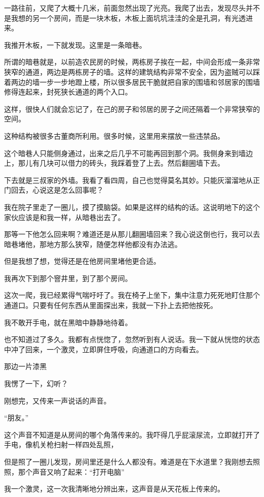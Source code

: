 一路往前，又爬了大概十几米，前面忽然出现了光亮。我爬了出去，发现尽头并不是我想的另一个房间，而是一块木板，木板上面坑坑洼洼的全是孔洞，有光透进来。

我推开木板，一下就发现。这里是一条暗巷。

所谓的暗巷就是，以前造农民房的时候，两栋房子挨在一起，中间会形成一条非常狭窄的通道，两边是两栋房子的墙。这样的建筑结构非常不安全，因为盗贼可以踩着两边的墙一步一步地蹬上楼，所以很多居民干脆就把自家的围墙和邻居家的围墙修得连起来，封死狭长通道的两个入口。

这样，很快人们就会忘记了，在己的房子和邻居的房子之间还隔着一个非常狭窄的空间。

这种结构被很多古董商所利用。很多时候，这里用来摆放一些违禁品。

这个暗巷人只能侧身通过，出来之后几乎不可能再回到那个洞。我侧身来到墙边上，那儿有几块可以借力的砖头，我踩着登了上去。然后翻圌墙下去。

下去就是三叔家的外墙。我看了看四周，自己也觉得莫名其妙。只能灰溜溜地从正门回去，心说这是怎么回事呢？

我在院子里走了一圈儿，摸了摸脑袋。如果是这样的结构的话。这说明地下的这个家伙应该是和我一样，从暗巷出去了。

那等一下他怎么回来啊？难道还是从那儿翻圌墙回来？我心说这倒也行，我可以去暗巷堵他，那地方那么狭窄，随便怎样他都没有办法逃。

但是我想了想，觉得还是在他房间里堵他更合适。

我再次下到那个窨井里，到了那个房间。

这次一爬，我已经累得气喘吁吁了。我在椅子上坐下，集中注意力死死地盯住那个通道口。只要有任何东西从里面探出来，我就一下扑上去把他按死。

我不敢开手电，就在黑暗中静静地待着。

也不知道过了多久。我都有点恍惚了，忽然听到有人说话。我一下就从恍惚的状态中冲了回来，一个激灵，立即屏住呼吸，向通道口的方向看去。

那边一片漆黑

我愣了一下，幻听？

刚想完，又传来一声说话的声音。

“朋友。”

这个声音不知道是从房间的哪个角落传来的。我吓得几乎屁滚尿流，立即就打开了手电，像机关枪扫射一样四处乱照，

但是照了一圈儿发现，房间里还是什么人都没有。难道是在下水道里？我刚想去照照，那个声音又响了起来：“打开电脑”

我一个激灵，这一次我清晰地分辨出来，这声音是从天花板上传来的。

